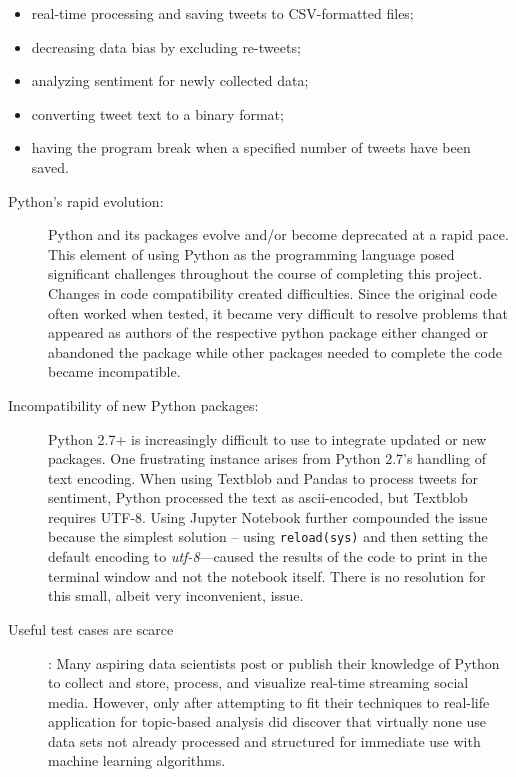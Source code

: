 \begin{itemize}	
\item real-time processing and saving tweets to CSV-formatted files;
\item decreasing data bias by excluding re-tweets;
\item analyzing sentiment for newly collected
data;
\item converting tweet text to a binary format;
\item having the program break when a specified
number of tweets have been saved.
\end{itemize}

\begin{description}
\item[Python's rapid evolution:] Python and its packages evolve and/or
  become deprecated at a rapid pace.  This element of using Python as
  the programming language posed significant challenges throughout the
  course of completing this project.  Changes in code compatibility
  created difficulties.  Since the original code often worked when
  tested, it became very difficult to resolve problems that appeared
  as authors of the respective python package either changed or
  abandoned the package while other packages needed to complete the
  code became incompatible.

\item[Incompatibility of new Python packages:] Python 2.7+ is
  increasingly difficult to use to integrate updated or new packages.
  One frustrating instance arises from Python 2.7's handling of text
  encoding.  When using Textblob and Pandas to process tweets for
  sentiment, Python processed the text as ascii-encoded, but Textblob
  requires UTF-8.  Using Jupyter Notebook further compounded the issue
  because the simplest solution – using \verb|reload(sys)| and then
  setting the default encoding to \emph{utf-8}—caused the results of
  the code to print in the terminal window and not the notebook
  itself.  There is no resolution for this small, albeit very
  inconvenient, issue.

\item[Useful test cases are scarce]: Many aspiring data scientists
  post or publish their knowledge of Python to collect and store,
  process, and visualize real-time streaming social media.  However,
  only after attempting to fit their techniques to real-life
  application for topic-based analysis did 
 discover that virtually
  none use data sets not already processed and structured for
  immediate use with machine learning algorithms.
\end{description}

